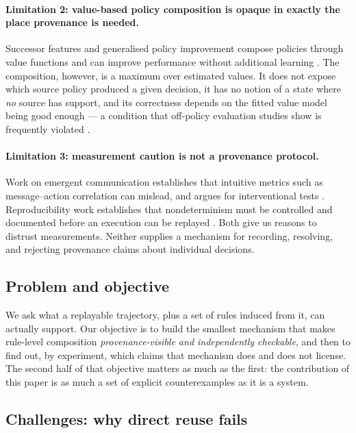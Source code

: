 \documentclass[11pt,a4paper]{article}
\begin{document}
\paragraph{Limitation 2: value-based policy composition is opaque in exactly the place provenance is needed.}
Successor features and generalised policy improvement compose policies through value functions and can improve performance without additional learning \citep{barreto2017,thakoor2022}. The composition, however, is a maximum over estimated values. It does not expose which source policy produced a given decision, it has no notion of a state where \emph{no} source has support, and its correctness depends on the fitted value model being good enough --- a condition that off-policy evaluation studies show is frequently violated \citep{voloshin2021,le2019}.

\paragraph{Limitation 3: measurement caution is not a provenance protocol.}
Work on emergent communication establishes that intuitive metrics such as message--action correlation can mislead, and argues for interventional tests \citep{lowe2019,kharitonov2019,chaabouni2020}. Reproducibility work establishes that nondeterminism must be controlled and documented before an execution can be replayed \citep{nagarajan2018}. Both give us reasons to distrust measurements. Neither supplies a mechanism for recording, resolving, and rejecting provenance claims about individual decisions.

\subsection{Problem and objective}
\label{sec:intro-problem}

We ask what a replayable trajectory, plus a set of rules induced from it, can actually support. Our objective is to build the smallest mechanism that makes rule-level composition \emph{provenance-visible and independently checkable}, and then to find out, by experiment, which claims that mechanism does and does not license. The second half of that objective matters as much as the first: the contribution of this paper is as much a set of explicit counterexamples as it is a system.

\subsection{Challenges: why direct reuse fails}
\label{sec:intro-challenges}
\end{document}
